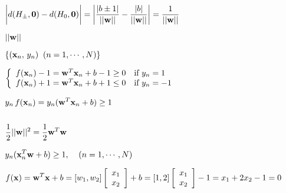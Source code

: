 \documentclass{article}
\def\lthtmlcheckvsize{\ifdim\ht\sizebox<\vsize 
  \ifdim\wd\sizebox<\hsize\expandafter\hfill\fi \expandafter\vfill
  \else\expandafter\vss\fi}%
\begin{document}
{\newpage\clearpage
{}%
$\displaystyle \bigg| d(H_\pm,{\bf0})-d(H_0,{\bf0}) \bigg|
=\bigg| \frac{|b\pm 1|}{||{\bf w}||}-\frac{|b|}{||{\bf w}||} \bigg|
=\frac{1}{||{\bf w}||}$%
\lthtmlindisplaymathZ
\lthtmlcheckvsize\clearpage}

{\newpage\clearpage
{}%
$ ||{\bf w}||$%
\lthtmlindisplaymathZ
\lthtmlcheckvsize\clearpage}

{\newpage\clearpage
{}%
$ \{({\bf x}_n,\,y_n)\;\;(n=1,\cdots,N)\}$%
\lthtmlindisplaymathZ
\lthtmlcheckvsize\clearpage}

{\newpage\clearpage
{}%
$\displaystyle \left\{\begin{array}{ll}
f({\bf x}_n)-1={\bf w}^T {\bf x}_n+b-1 \ge 0 & \mbox{if $y_n=1$}\\
f({\bf x}_n)+1={\bf w}^T {\bf x}_n+b+1 \le 0 & \mbox{if $y_n=-1$}
\end{array}\right.$%
\lthtmlindisplaymathZ
\lthtmlcheckvsize\clearpage}

{\newpage\clearpage
{}%
$\displaystyle y_n\,f({\bf x}_n)=y_n ({\bf w}^T{\bf x}_n +b) \ge 1$%
\lthtmlindisplaymathZ
\lthtmlcheckvsize\clearpage}

{\newpage\clearpage
{}%
$\displaystyle \;\;\;$%
\lthtmlindisplaymathZ
\lthtmlcheckvsize\clearpage}

{\newpage\clearpage
{}%
$\displaystyle \frac{1}{2}||{\bf w}||^2 =\frac{1}{2}{\bf w}^T {\bf w}$%
\lthtmlindisplaymathZ
\lthtmlcheckvsize\clearpage}

{\newpage\clearpage
{}%
$\displaystyle y_n ({\bf x}_n^T {\bf w}+b) \ge 1,\;\;\;\;(n=1,\cdots,N)$%
\lthtmlindisplaymathZ
\lthtmlcheckvsize\clearpage}

{\newpage\clearpage
{}%
$\displaystyle f({\bf x})={\bf w}^T{\bf x}+b=[w_1,w_2]
\left[ \begin{array}{c} x_1 \\x_2 \end{array} \right]+b
=[1, 2]\left[ \begin{array}{c} x_1 \\x_2 \end{array} \right]-1
=x_1+2x_2-1=0$%
\lthtmlindisplaymathZ
\lthtmlcheckvsize\clearpage}
\end{document}
